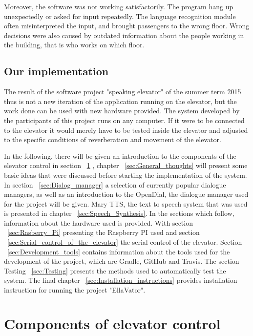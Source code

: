 \documentclass[a4paper, 12pt]{article}
\begin{document}
Moreover, the software was not working satisfactorily.
The program hang up unexpectedly or asked for input repeatedly.
The language recognition module often misinterpreted the input, and brought passengers to the wrong floor.
Wrong decisions were also caused by outdated information about the people working in the building, that is who works on which floor.
\newline

\subsection{Our implementation}
The result of the software project "speaking elevator" of the summer term 2015
thus is not a new iteration of the application running on the elevator, but the
work done can be used with new hardware provided.
The system developed by the participants of this project runs on any computer.
If it were to be connected to the elevator it would merely have to be tested inside the elevator and adjusted to the specific conditions of reverberation and movement of the elevator. \newline

In the following, there will be given an introduction to the components of the elevator control in section  ~\ref{sec:Components_of_elevator_control} , chapter ~\ref{sec:General_thoughts} will present some basic ideas that were discussed before starting the implementation of the system.
In section ~\ref{sec:Dialog_manager} a selection of currently popular dialogue managers, as well as an introduction to the OpenDial, the dialogue manager used for the project will be given.
Mary TTS, the text to speech system that was used is presented in chapter ~\ref{sec:Speech_Synthesis}. \newline
In the sections which follow, information about the hardware used is provided.
With section ~\ref{sec:Rasberry_Pi} presenting the Raspberry PI used and section ~\ref{sec:Serial_control_of_the_elevator} the serial control of the elevator.
Section ~\ref{sec:Development_tools} contains information about the tools used for the development of the project, which are Gradle, GitHub and Travis.
The section Testing ~\ref{sec:Testing} presents the methods used to automatically test the system.
The final chapter ~\ref{sec:Installation_instructions} provides installation instruction for running the project "EllaVator".

\newpage
\section{Components of elevator control}
\label{sec:Components_of_elevator_control}
\end{document}
